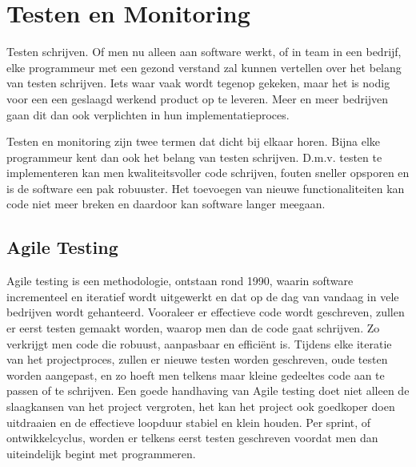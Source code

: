 \section{Testen en Monitoring}
\label{sec:testAndMonitoring}

Testen schrijven. Of men nu alleen aan software werkt, of in team in een bedrijf, elke programmeur met een gezond verstand zal kunnen vertellen over het belang van testen schrijven. Iets waar vaak wordt tegenop gekeken, maar het is nodig voor een een geslaagd werkend product op te leveren. Meer en meer bedrijven gaan dit dan ook verplichten in hun implementatieproces. 

Testen en monitoring zijn twee termen dat dicht bij elkaar horen. Bijna elke programmeur kent dan ook het belang van testen schrijven. D.m.v. testen te implementeren kan men kwaliteitsvoller code schrijven, fouten sneller opsporen en is de software een pak robuuster. Het toevoegen van nieuwe functionaliteiten kan code niet meer breken en daardoor kan software langer meegaan. 

\subsection{Agile Testing}
\label{sec:agile}

Agile testing is een methodologie, ontstaan rond 1990, waarin software incrementeel en iteratief wordt uitgewerkt en dat op de dag van vandaag in vele bedrijven wordt gehanteerd. Vooraleer er effectieve code wordt geschreven, zullen er eerst testen gemaakt worden, waarop men dan de code gaat schrijven. Zo verkrijgt men code die robuust, aanpasbaar en efficiënt is. Tijdens elke iteratie van het projectproces, zullen er nieuwe testen worden geschreven, oude testen worden aangepast, en zo hoeft men telkens maar kleine gedeeltes code aan te passen of te schrijven. Een goede handhaving van Agile testing doet niet alleen de slaagkansen van het project vergroten, het kan het project ook goedkoper doen uitdraaien en de effectieve loopduur stabiel en klein houden.
Per sprint, of ontwikkelcyclus, worden er telkens eerst testen geschreven voordat men dan uiteindelijk begint met programmeren. \autocite{CHAKRAVORTY2014536}

